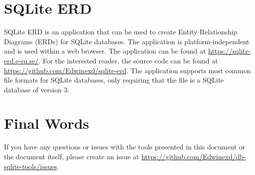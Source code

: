\documentclass[a4paper,11pt,oneside]{article}
\begin{document}
\begin{sloppypar}
\section{SQLite ERD}
\label{sqliteERD}
SQLite ERD is an application that can be used to create Entity Relationship Diagrams (ERDs) for SQLite databases. The application is platform-independent and is used within a web browser. The application can be found at \url{https://sqlite-erd.e-su.se/}. For the interested reader, the source code can be found at \url{https://github.com/Edwinexd/sqlite-erd}.
The application supports most common file formats for SQLite databases, only requiring that the file is a SQLite database of version 3.


\section{Final Words}
\label{finalWords}
If you have any questions or issues with the tools presented in this document or the document itself, please create an issue at \url{https://github.com/Edwinexd/db-sqlite-tools/issues}.

\pagebreak



\end{sloppypar}
\end{document}
